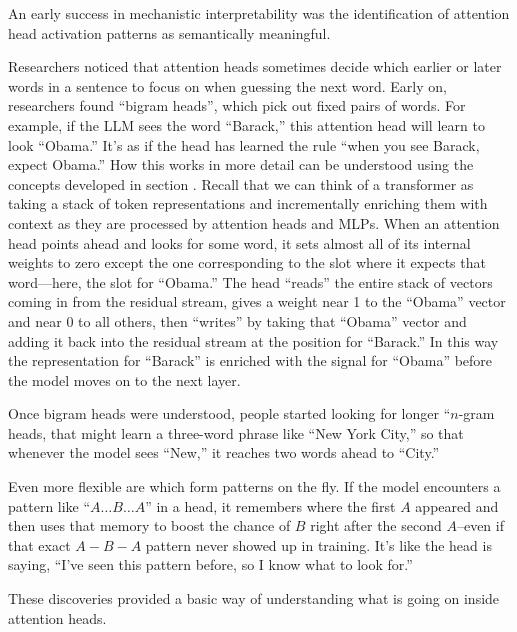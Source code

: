 
An early success in mechanistic interpretability was the identification of
attention head activation patterns as semantically meaningful. 

Researchers noticed that attention heads sometimes decide which earlier or
later words in a sentence to focus on when guessing the next word. Early on,
researchers found ``bigram heads'',  which pick out fixed pairs of words. For
example, if the LLM sees the word ``Barack,'' this attention head will learn to
look ``Obama.'' It's as if the head has learned the rule ``when you see Barack,
expect Obama.'' How this works in more detail can be understood using the
concepts developed in section . Recall that we can think
of a transformer as taking a stack of token representations and incrementally
enriching them with context as they are processed by attention heads and MLPs.
When an attention head points ahead and looks for some word, it sets almost all
of its internal weights to zero except the one corresponding to the slot where
it expects that word—here, the slot for ``Obama.'' The head ``reads'' the
entire stack of vectors coming in from the residual stream, gives a weight near
1 to the ``Obama'' vector and near 0 to all others, then ``writes'' by taking
that “Obama” vector and adding it back into the residual stream at the position
for ``Barack.'' In this way the representation for “Barack” is enriched with
the signal for “Obama” before the model moves on to the next layer.  

Once bigram heads were understood, people started looking for longer ``$n$-gram
heads, that might learn a three-word phrase like “New York City,'' so that
whenever the model sees ``New,'' it reaches two words ahead to ``City.''

Even more flexible are  which form patterns on the
fly. If the model encounters a pattern like ``$A \ldots B \ldots A$'' in a
head, it remembers where the first $A$ appeared and then uses that memory to
boost the chance of $B$ right after the second $A$--even if that exact $A-B-A$
pattern never showed up in training. It's like the head is saying, ``I've seen
this pattern before, so I know what to look for.''

These discoveries provided a basic way of understanding what is going on inside
attention heads. 

